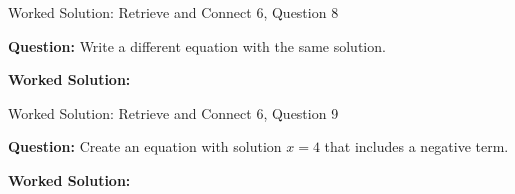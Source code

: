 \documentclass{beamer}
\newcommand{\ashow}[1]{\uncover<2->{\textcolor{red}{\small #1}}}
\begin{document}
\begin{frame}{Worked Solution: Retrieve and Connect 6, Question 8}

\textbf{Question:} Write a different equation with the same solution.

\textbf{Worked Solution:} \ashow{Since $3x+4=16$ gives $x=4$, a different equation is $2x+3=11$, which also gives $x=4$.}

\end{frame}

\begin{frame}{Worked Solution: Retrieve and Connect 6, Question 9}

\textbf{Question:} Create an equation with solution $x=4$ that includes a negative term.

\textbf{Worked Solution:} \ashow{For example, $2x-3=5$: adding $3$ gives $2x=8$, so $x=4$.}

\end{frame}

\end{document}
